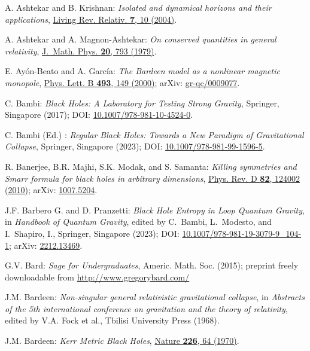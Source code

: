 \begin{thebibliography}{123}
A. Ashtekar and B. Krishnan: {\em Isolated and dynamical horizons
and their applications},
\href{https://doi.org/10.12942/lrr-2004-10}{Living Rev. Relativ. {\bf 7}, 10 (2004)}.

A. Ashtekar and A. Magnon-Ashtekar:
{\em On conserved quantities in general relativity},
\href{https://doi.org/10.1063/1.524151}{J.~Math. Phys. {\bf 20}, 793 (1979)}.

E. Ayón-Beato and A. García:
{\em The Bardeen model as a nonlinear magnetic monopole},
\href{https://doi.org/10.1016/S0370-2693(00)01125-4}{Phys. Lett. B {\bf 493}, 149 (2000)};
arXiv: \href{https://arxiv.org/abs/gr-qc/0009077}{gr-qc/0009077}.

C. Bambi: {\em Black Holes: A Laboratory for Testing Strong Gravity},
Springer, Singapore (2017);
DOI: \href{https://doi.org/10.1007/978-981-10-4524-0}{10.1007/978-981-10-4524-0}.

C. Bambi (Ed.) : {\em Regular Black Holes: Towards a New Paradigm of Gravitational Collapse},
Springer, Singapore (2023);
DOI: \href{https://doi.org/10.1007/978-981-99-1596-5}{10.1007/978-981-99-1596-5}.

R. Banerjee, B.R. Majhi, S.K. Modak, and S. Samanta:
{\em Killing symmetries and Smarr formula for black holes in arbitrary dimensions},
\href{https://doi.org/10.1103/PhysRevD.82.124002}{Phys. Rev. D {\bf 82}, 124002 (2010)};
arXiv: \href{https://arxiv.org/abs/1007.5204}{1007.5204}.

J.F. Barbero G. and D. Pranzetti:
{\em Black Hole Entropy in Loop Quantum Gravity},
in {\em Handbook of Quantum Gravity}, edited by C.~Bambi, L.~Modesto, and I.~Shapiro, I.,
Springer, Singapore (2023);
DOI: \href{https://doi.org/10.1007/978-981-19-3079-9_104-1}{10.1007/978-981-19-3079-9\_104-1};
arXiv: \href{https://arxiv.org/abs/2212.13469}{2212.13469}.

G.V. Bard: {\em Sage for Undergraduates}, Americ. Math. Soc. (2015);
preprint freely downloadable from \url{http://www.gregorybard.com/}

J.M. Bardeen:
{\em Non-singular general relativistic gravitational collapse},
in \emph{Abstracts of the 5th international conference on gravitation and the theory of relativity}, edited by V.A. Fock et al., Tbilisi University Press (1968).

J.M. Bardeen:
{\em Kerr Metric Black Holes},
\href{https://doi.org/10.1038/226064a0}{Nature {\bf 226}, 64 (1970)}.


\end{thebibliography}

